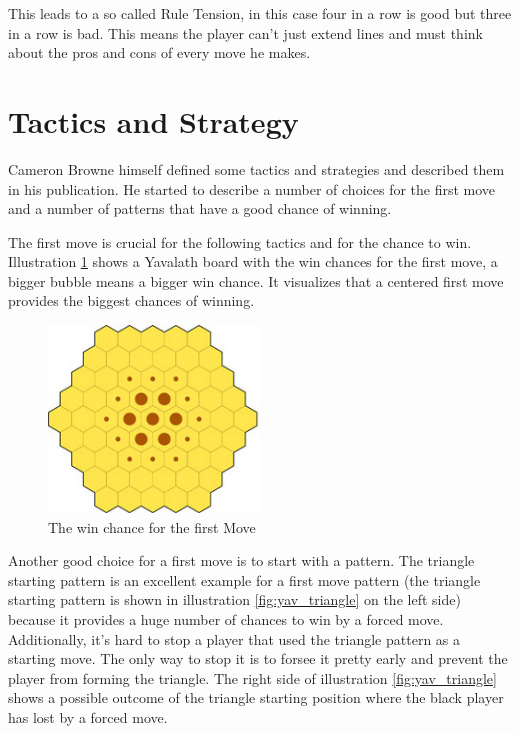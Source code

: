 \documentclass[english]{report}
\begin{document}
This leads to a so called Rule Tension, in this case four in a row is good but three in a row is bad. This means the player can't just extend lines and must think about the pros and cons of every move he makes.\cite{yvalath}

\section{Tactics and Strategy}
Cameron Browne himself defined some tactics and strategies and described them in his publication. He started to describe a number of choices for the first move and a number of patterns that have a good chance of winning.


The first move is crucial for the following tactics and for the chance to win.
Illustration \ref{fig:yav_winChance} shows a Yavalath board with the win chances for the first move, a bigger bubble means a bigger win chance. It visualizes that a centered first move provides the biggest chances of winning.\cite{yvalath}


\begin{figure}[H]
\centering
\includegraphics[width=0.5\textwidth]{Abbildungen/yav_winChance.png}
\caption[The chances of winning for the first Move, Source:\cite{yvalath}]{The win chance for the first Move}
\label{fig:yav_winChance}
\end{figure}


Another good choice for a first move is to start with a pattern. The triangle starting pattern is an excellent example for a first move pattern (the triangle starting pattern is shown in illustration \ref{fig:yav_triangle} on the left side) because it provides a huge number of chances to win by a forced move. Additionally, it's hard to stop a player that used the triangle pattern as a starting move. The only way to stop it is to forsee it pretty early and prevent the player from forming the triangle.
The right side of illustration \ref{fig:yav_triangle} shows a possible outcome of the triangle starting position where the black player has lost by a forced move.\cite{yvalath}
\end{document}
